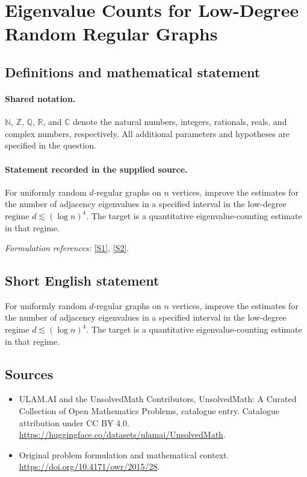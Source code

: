 \documentclass[11pt]{article}
\newcommand{\sref}[2]{\hyperlink{source:#1:#2}{[S#2]}}
\begin{document}
\section{Eigenvalue Counts for Low-Degree Random Regular Graphs}\label{statement}

\subsection{Definitions and mathematical statement}

\paragraph{Shared notation.}$\mathbb N$, $\mathbb Z$, $\mathbb Q$, $\mathbb R$, and $\mathbb C$ denote the natural numbers, integers, rationals, reals, and complex numbers, respectively. All additional parameters and hypotheses are specified in the question.


\paragraph{Statement recorded in the supplied source.}
For uniformly random $d$-regular graphs on $n$ vertices, improve the estimates for the number of adjacency eigenvalues in a specified interval in the low-degree regime $d\lesssim(\log n)^4$. The target is a quantitative eigenvalue-counting estimate in that regime.
\par\smallskip\textit{Formulation references:} \sref{statement}{1}, \sref{statement}{2}.
\subsection{Short English statement}
For uniformly random $d$-regular graphs on $n$ vertices, improve the estimates for the number of adjacency eigenvalues in a specified interval in the low-degree regime $d\lesssim(\log n)^4$. The target is a quantitative eigenvalue-counting estimate in that regime.
\subsection{Sources}
\begin{itemize}
\item[\hypertarget{source:statement:1}{S1}] ULAM.AI and the UnsolvedMath Contributors, UnsolvedMath: A Curated Collection of Open Mathematics Problems, catalogue entry. Catalogue attribution under CC BY 4.0.
\url{https://huggingface.co/datasets/ulamai/UnsolvedMath}.
\item[\hypertarget{source:statement:2}{S2}] Original problem formulation and mathematical context.
\url{https://doi.org/10.4171/owr/2015/28}.
\end{itemize}
\label{end:statement}
\end{document}
